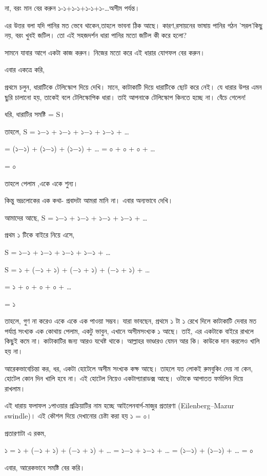 \documentclass[
]{book}
\begin{document}
না, বরং মান বের করুন ১-১+১-১+১-১+১-\ldots অসীম পর্যন্ত।

এর উত্তর বলা যদি পানির মত ভেবে থাকেন,তাহলে ভাবনা ঠিক আছে। কারণ,রসায়নের ভাষায় পানির গঠন 'সরল'কিছু নয়, বরং খুবই জটিল। তো এই সহজদর্শন ধারা পানির মতো জটিল কী করে হলো?

সামনে যাবার আগে একটা কাজ করুন। নিজের মতো করে এই ধারার যোগফল বের করুন।

এবার একত্রে করি,

প্রথমে চলুন, ধারাটিকে টেলিস্কোপ দিয়ে দেখি। মানে, কাটাকাটি দিয়ে ধারাটিকে ছোট করে নেই। যে ধারার উপর এমন ছুরি চালানো হয়, তাকেই বলে টেলিস্কোপিক ধারা। তাই আপনাকে টেলিস্কোপ কিনতে হচ্ছে না। বেঁচে গেলেন!

ধরি, ধারাটির সমষ্টি = S।

তাহলে, S = ১−১ + ১−১ + ১−১ + ১−১ + \ldots{}

= (১−১) + (১−১) + (১−১) + \ldots{} = ০ + ০ + ০ + \ldots{}

= ০

তাহলে পেলাম ,একে একে শুন্য।

কিন্তু ভদ্রলোকের এক কথা- প্রবাদটা আমরা মানি না। এবার অন্যভাবে দেখি।

আমাদের আছে, S = ১−১ + ১−১ + ১−১ + ১−১ + \ldots{}

প্রথম ১ টিকে বাইরে নিয়ে এসে,

S = ১−১ + ১−১ + ১−১ + ১−১ + \ldots{}

S = ১ + (−১ + ১) + (−১ + ১) + (−১ + ১) + \ldots{}

= ১ + ০ + ০ + ০ + \ldots{}

= ১

তাহলে, গুণ না করেও একে একে এক পাওয়া সম্ভব। যারা ভাবছেন, প্রথমে ১ টা ১ রেখে দিলে কাটাকাটি দেবার মত পর্যাপ্ত সংখ্যক এক কোথায় পেলাম, একটু ভাবুন, এখানে অসীমসংখ্যক ১ আছে। তাই, এর একটাকে বাইরে রাখলে কিছুই কমে না। কাটাকাটির জন্য আরও যথেষ্ট থাকে। আল্লাহর ভাণ্ডারও যেমন আর কি। কাউকে দান করলেও খালি হয় না।

আরেকভাবেচিন্তা কর, ধর, একটা হোটেলে অসীম সংখ্যক কক্ষ আছে। তাহলে যত লোকই রুমবুকিং দেয় না কেন, হোটেল কোন দিন খালি হবে না। এই হোটেল নিয়েও একটাপ্যারাডক্স আছে। ওটাকে আপাতত ফর্মালিন দিয়ে রাখলাম।

এই ধারায় ফলাফল ১পাওয়ার প্রক্রিয়াটির নাম হচ্ছে আইলেনবার্গ-মাজুর প্রতারণা (Eilenberg--Mazur swindle)। এই কৌশল দিয়ে দেখানোর চেষ্টা করা হয় ১ = ০।

প্রতারণাটা এ রকম,

১ = ১ + (−১ + ১) + (−১ + ১) + \ldots{} = ১−১ + ১−১ + \ldots{} = (১−১) + (১−১) + \ldots{} = ০

এবার, আরেকভাবে সমষ্টি বের করি।
\end{document}
